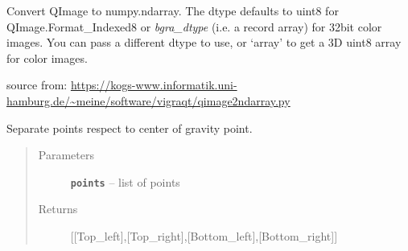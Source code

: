 \documentclass[letterpaper,10pt,english]{sphinxmanual}
\begin{document}

\begin{fulllineitems}
\label{RRtoolbox.lib:RRtoolbox.lib.image.np2str}
\end{fulllineitems}


\begin{fulllineitems}
\label{RRtoolbox.lib:RRtoolbox.lib.image.plt2bgr}
\end{fulllineitems}


\begin{fulllineitems}
\label{RRtoolbox.lib:RRtoolbox.lib.image.plt2bgra}
\end{fulllineitems}


\begin{fulllineitems}
\label{RRtoolbox.lib:RRtoolbox.lib.image.qi2np}
Convert QImage to numpy.ndarray.  The dtype defaults to uint8
for QImage.Format\_Indexed8 or \emph{bgra\_dtype} (i.e. a record array)
for 32bit color images.  You can pass a different dtype to use, or
`array' to get a 3D uint8 array for color images.

source from: \href{https://kogs-www.informatik.uni-hamburg.de/~meine/software/vigraqt/qimage2ndarray.py}{https://kogs-www.informatik.uni-hamburg.de/\textasciitilde{}meine/software/vigraqt/qimage2ndarray.py}

\end{fulllineitems}


\begin{fulllineitems}
\label{RRtoolbox.lib:RRtoolbox.lib.image.quadrants}
Separate points respect to center of gravity point.
\begin{quote}\begin{description}
\item[{Parameters}] \leavevmode
\textbf{\texttt{points}} -- list of points

\item[{Returns}] \leavevmode
{[}{[}Top\_left{]},{[}Top\_right{]},{[}Bottom\_left{]},{[}Bottom\_right{]}{]}

\end{description}\end{quote}

\end{fulllineitems}
\end{document}
